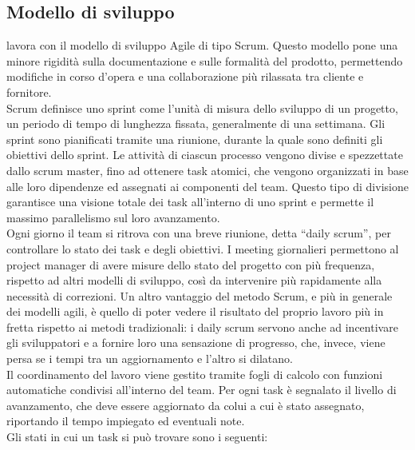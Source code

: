    \subsection{Modello di sviluppo}
   \nomeAzienda{} lavora con il modello di sviluppo Agile di tipo Scrum. Questo modello pone una minore rigidità sulla documentazione e sulle formalità del prodotto, permettendo modifiche in corso d'opera e una collaborazione più rilassata tra cliente e fornitore.
   \\
   Scrum definisce uno sprint come l'unità di misura dello sviluppo di un progetto, un periodo di tempo di lunghezza fissata, generalmente di una settimana.
   Gli sprint sono pianificati tramite una riunione, durante la quale sono definiti gli obiettivi dello sprint. Le attività di ciascun processo vengono divise e spezzettate dallo scrum master, fino ad ottenere task atomici, che vengono organizzati in base alle loro dipendenze ed assegnati ai componenti del team. Questo tipo di divisione garantisce una visione totale dei task all'interno di uno sprint e permette il massimo parallelismo sul loro avanzamento.
   \\
   Ogni giorno il team si ritrova con una breve riunione, detta ``daily scrum'', per controllare lo stato dei task e degli obiettivi. I meeting giornalieri permettono al project manager di avere misure dello stato del progetto con più frequenza, rispetto ad altri modelli di sviluppo, così da intervenire più rapidamente alla necessità di correzioni. 
   Un altro vantaggio del metodo Scrum, e più in generale dei modelli agili, è quello di poter vedere il risultato del proprio lavoro più in fretta rispetto ai metodi tradizionali: i daily scrum servono anche ad incentivare gli sviluppatori e a fornire loro una sensazione di progresso, che, invece, viene persa se i tempi tra un aggiornamento e l'altro si dilatano.
   \\
   Il coordinamento del lavoro viene gestito tramite fogli di calcolo con funzioni automatiche condivisi all'interno del team. Per ogni task è segnalato il livello di avanzamento, che deve essere aggiornato da colui a cui è stato assegnato, riportando il tempo impiegato ed eventuali note.
   \\
   Gli stati in cui un task si può trovare sono i seguenti:
